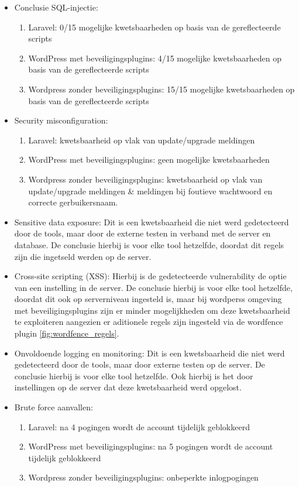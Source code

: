   \begin{itemize}
    \item Conclusie SQL-injectie:
    \begin{enumerate}
      \item Laravel: 0/15 mogelijke kwetsbaarheden op basis van de gereflecteerde scripts
      \item WordPress met beveiligingsplugins: 4/15 mogelijke kwetsbaarheden op basis van de gereflecteerde scripts
      \item Wordpress zonder beveiligingsplugins: 15/15 mogelijke kwetsbaarheden op basis van de gereflecteerde scripts
    \end{enumerate}
    \item Security misconfiguration:
    \begin{enumerate}
      \item Laravel: kwetsbaarheid op vlak van update/upgrade meldingen
      \item WordPress met beveiligingsplugins: geen mogelijke kwetsbaarheden
      \item Wordpress zonder beveiligingsplugins: kwetsbaarheid op vlak van update/upgrade meldingen \& meldingen bij 
            foutieve wachtwoord en correcte gerbuikersnaam.
    \end{enumerate}
    \item Sensitive data exposure: Dit is een kwetsbaarheid die niet werd gedetecteerd door de tools, maar door de 
          externe testen in verband met de server en database. De conclusie hierbij is voor elke tool hetzelfde, doordat dit 
          regels zijn die ingetseld werden op de server.
    \item Cross-site scripting (XSS): Hierbij is de gedetecteerde vulnerability de optie van een instelling in de 
          server. De conclusie hierbij is voor elke tool hetzelfde, doordat dit ook op serverniveau ingesteld is, maar bij wordperss omgeving met beveiligingsplugins 
          zijn er minder mogelijkheden om deze kwetsbaarheid te exploiteren aangezien er aditionele regels zijn ingesteld 
          via de wordfence plugin \ref{fig:wordfence_regels}.
    \item Onvoldoende logging en monitoring: Dit is een kwetsbaarheid die niet werd gedetecteerd door de tools, maar door 
          externe testen op de server. De conclusie hierbij is voor elke tool hetzelfde. Ook hierbij is het door instellingen 
          op de server dat deze kwetsbaarheid werd opgelost.
    \item Brute force aanvallen:
    \begin{enumerate}
      \item Laravel: na 4 pogingen wordt de account tijdelijk geblokkeerd
      \item WordPress met beveiligingsplugins: na 5 pogingen wordt de account tijdelijk geblokkeerd
      \item Wordpress zonder beveiligingsplugins: onbeperkte inlogpogingen
    \end{enumerate}
  \end{itemize}

